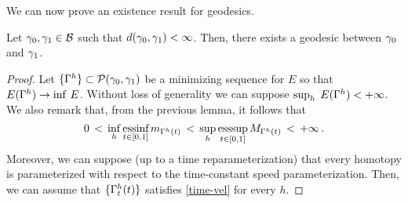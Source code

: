 We can now prove an existence result for geodesics. 

\begin{thm}\label{local_existence}
Let $\gamma_0, \gamma_1 \in \mathcal{B}$ such that $d(\gamma_0,\gamma_1)< \infty$.
Then, there exists a geodesic between $\gamma_0$ and $\gamma_1$.
\end{thm}

\begin{proof}
Let $\{\Gamma^h\} \subset \mathcal{P}(\gamma_0,\gamma_1)$ be a minimizing sequence for $E$ so that $E(\Gamma^h)\rightarrow \inf\,E$. Without loss of generality we can suppose $\sup_h \; E(\Gamma^h)< +\infty$.  We also remark that, from the previous lemma, it follows that
$$0 \,<\, \underset{h}{\inf}\,\underset{t\in [0,1]}{\mbox{essinf}}\, m_{\Gamma^h(t)}\, <\,\underset{h}{\sup}\,\underset{t\in [0,1]}{\mbox{esssup}}\, M_{\Gamma^h(t)}\, <\,+\infty\,.
$$
Moreover, we can suppose (up to a time reparameterization) that every homotopy is parameterized with respect to the time-constant speed parameterization. Then, we can assume that  $\{\Gamma^h_t(t)\}$  satisfies \eqref{time-vel} for every $h$. 



\end{proof}
